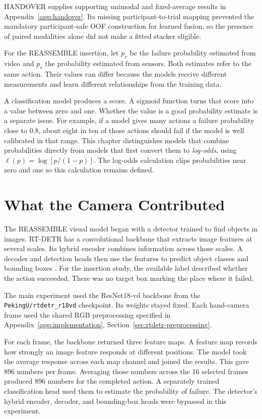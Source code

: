 HANDOVER supplies supporting unimodal and fixed-average results in
Appendix~\ref{app:handover}. Its missing participant-to-trial mapping prevented the
mandatory participant-safe OOF construction for learned fusion, so the presence of
paired modalities alone did not make a fitted stacker eligible.

For the REASSEMBLE insertion, let \(p_v\) be the failure probability estimated from
video and \(p_s\) the probability estimated from sensors. Both estimates refer to the
same action. Their values can differ because the models receive different measurements
and learn different relationships from the training data.

A classification model produces a score. A sigmoid function turns that score into a
value between zero and one. Whether the value is a good probability estimate is a
separate issue. For example, if a model gives many actions a failure probability close
to 0.8, about eight in ten of those actions should fail if the model is well calibrated
in that range. This chapter distinguishes models that combine probabilities directly
from models that first convert them to \textit{log-odds}, using
\(\ell(p)=\log[p/(1-p)]\). The log-odds calculation clips probabilities near zero and one so this
calculation remains defined.

\section{What the Camera Contributed}

The REASSEMBLE visual model began with a detector trained to find objects in images.
RT-DETR has a convolutional backbone that extracts image features at several scales. Its
hybrid encoder combines information across those scales. A decoder and detection heads
then use the features to predict object classes and bounding boxes
\parencite{Zhao2024RTDETR}. For the insertion study, the available label described
whether the action succeeded. There was no target box marking the place where it failed.

The main experiment used the ResNet18-vd backbone from the
\texttt{PekingU/rtdetr\_r18vd} checkpoint. Its weights stayed fixed. Each hand-camera
frame used the shared RGB preprocessing specified in
Appendix~\ref{app:implementation}, Section~\ref{sec:rtdetr-preprocessing}.

For each frame, the backbone returned three feature maps. A feature map records how
strongly an image feature responds at different positions. The model took the average
response across each map channel and joined the results. This gave 896 numbers per
frame. Averaging those numbers across the 16 selected frames produced 896 numbers for
the completed action. A separately trained classification head used them to estimate the
probability of failure. The detector's hybrid encoder, decoder, and bounding-box heads
were bypassed in this experiment.


